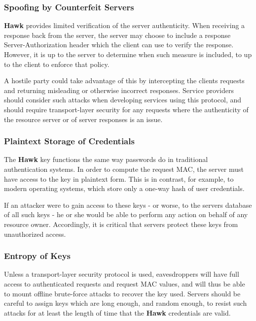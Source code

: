 \subsubsection*{Spoofing by Counterfeit Servers}

{\bfseries Hawk} provides limited verification of the server authenticity. When receiving a response back from the server, the server may choose to include a response {\ttfamily Server-\/\+Authorization} header which the client can use to verify the response. However, it is up to the server to determine when such measure is included, to up to the client to enforce that policy.

A hostile party could take advantage of this by intercepting the client\textquotesingle{}s requests and returning misleading or otherwise incorrect responses. Service providers should consider such attacks when developing services using this protocol, and should require transport-\/layer security for any requests where the authenticity of the resource server or of server responses is an issue.

\subsubsection*{Plaintext Storage of Credentials}

The {\bfseries Hawk} key functions the same way passwords do in traditional authentication systems. In order to compute the request M\+AC, the server must have access to the key in plaintext form. This is in contrast, for example, to modern operating systems, which store only a one-\/way hash of user credentials.

If an attacker were to gain access to these keys -\/ or worse, to the server\textquotesingle{}s database of all such keys -\/ he or she would be able to perform any action on behalf of any resource owner. Accordingly, it is critical that servers protect these keys from unauthorized access.

\subsubsection*{Entropy of Keys}

Unless a transport-\/layer security protocol is used, eavesdroppers will have full access to authenticated requests and request M\+AC values, and will thus be able to mount offline brute-\/force attacks to recover the key used. Servers should be careful to assign keys which are long enough, and random enough, to resist such attacks for at least the length of time that the {\bfseries Hawk} credentials are valid.

